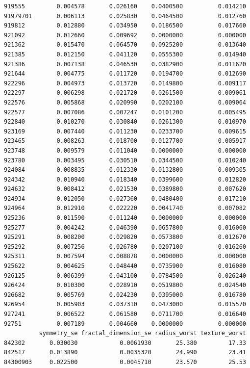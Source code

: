 \documentclass[
  letterpaper,
  DIV=11,
  numbers=noendperiod]{scrartcl}
\begin{document}
\begin{verbatim}
919555         0.004578       0.026160    0.0400500          0.014210
91979701       0.006113       0.025830    0.0464500          0.012760
919812         0.012880       0.034950    0.0186500          0.017660
921092         0.012660       0.009692    0.0000000          0.000000
921362         0.015470       0.064570    0.0925200          0.013640
921385         0.012150       0.041120    0.0555300          0.014940
921386         0.007138       0.046530    0.0382900          0.011620
921644         0.004775       0.011720    0.0194700          0.012690
922296         0.004973       0.013720    0.0149800          0.009117
922297         0.006298       0.021720    0.0261500          0.009061
922576         0.005868       0.020990    0.0202100          0.009064
922577         0.007086       0.007247    0.0101200          0.005495
922840         0.010270       0.030840    0.0261300          0.010970
923169         0.007440       0.011230    0.0233700          0.009615
923465         0.008263       0.018700    0.0127700          0.005917
923748         0.009579       0.011040    0.0000000          0.000000
923780         0.003495       0.030510    0.0344500          0.010240
924084         0.008835       0.012330    0.0132800          0.009305
924342         0.010940       0.018340    0.0399600          0.012820
924632         0.008412       0.021530    0.0389800          0.007620
924934         0.012050       0.027360    0.0480400          0.017210
924964         0.012910       0.022220    0.0041740          0.007082
925236         0.011590       0.011240    0.0000000          0.000000
925277         0.004242       0.046390    0.0657800          0.016060
925291         0.008200       0.029820    0.0573800          0.012670
925292         0.007256       0.026780    0.0207100          0.016260
925311         0.007594       0.008878    0.0000000          0.000000
925622         0.004625       0.048440    0.0735900          0.016080
926125         0.006399       0.043100    0.0784500          0.026240
926424         0.010300       0.028910    0.0519800          0.024540
926682         0.005769       0.024230    0.0395000          0.016780
926954         0.005903       0.037310    0.0473000          0.015570
927241         0.006522       0.061580    0.0711700          0.016640
92751          0.007189       0.004660    0.0000000          0.000000
          symmetry_se fractal_dimension_se radius_worst texture_worst
842302       0.030030            0.0061930       25.380         17.33
842517       0.013890            0.0035320       24.990         23.41
84300903     0.022500            0.0045710       23.570         25.53

\end{verbatim}
\end{document}
